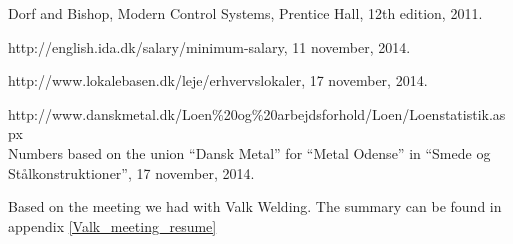 \begin{thebibliography}{9}
	Dorf and Bishop,
	Modern Control Systems,
	Prentice Hall, 
	12th edition, 
	2011.

	http://english.ida.dk/salary/minimum-salary,
	11 november,
	2014.
	
	http://www.lokalebasen.dk/leje/erhvervslokaler,
	17 november,
	2014.
	
	http://www.danskmetal.dk/Loen\%20og\%20arbejdsforhold/Loen/Loenstatistik.aspx \\
	Numbers based on the union ``Dansk Metal'' for ``Metal Odense'' in ``Smede og Stålkonstruktioner'',
	17 november,
	2014. 
	
	Based on the meeting we had with Valk Welding.
	The summary can be found in appendix \ref{Valk_meeting_resume}
	
\end{thebibliography}
